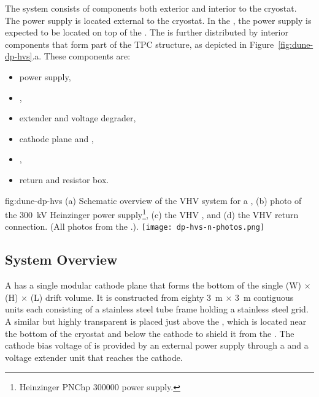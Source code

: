 The  system consists of components both exterior and interior to the cryostat. The  power supply is located external to the cryostat.  In the , the  power supply is expected to be located on top of the  \fdth. The  is further distributed by interior components that form part of the TPC structure, as depicted in Figure~\ref{fig:dune-dp-hvs}.a.  These components are:

\begin{itemize}
\item power supply,
\item {} \fdth,
\item {} extender and voltage degrader,
\item cathode plane and , 
\item {},
\item {} return \fdth and resistor box.
\end{itemize}


\begin{dunefigure}
{fig:dune-dp-hvs}
{(a) Schematic overview of the VHV system for a \dpmod{}, 
(b) photo of the \SI{300}{\kV} Heinzinger power supply\footnote{Heinzinger\texttrademark{} PNChp 300000 power supply.}, (c) the VHV \fdth{}, and (d) the VHV return connection. (All photos from the .).}
\texttt{[image: dp-hvs-n-photos.png]}
\end{dunefigure}

\subsection{System Overview}

A \dpmod  has a single modular cathode plane that forms the bottom of the single
  \dptpcwdth (W) $\times$ \tpcheight (H) $\times$ \dptpclen (L) drift volume. It is constructed from eighty \SI{3}{\m} $\times$ \SI{3}{\m} contiguous units each consisting of a stainless steel tube frame holding a stainless steel grid. %
A similar but highly transparent  is placed just above the , which is located near the bottom of the cryostat and below the cathode to shield it from the . The cathode bias voltage of \dptargetdriftvoltneg is provided by an external  power supply through a  \fdth and a voltage extender unit that reaches the cathode.
 
